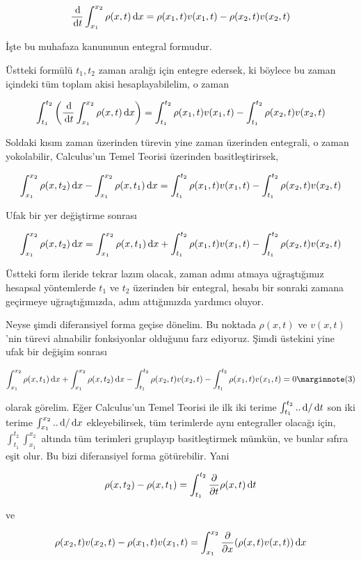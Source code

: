 \documentclass[12pt,fleqn]{article}\usepackage{../../common}
\begin{document}
$$
\frac{\,\mathrm{d}}{\,\mathrm{d} t} \int _{x_1}^{x_2} \rho(x,t) \,\mathrm{d} x =
\rho(x_1,t) v(x_1,t) - \rho(x_2,t) v(x_2,t)
$$

İşte bu muhafaza kanununun entegral formudur. 

Üstteki formülü $t_1,t_2$ zaman aralığı için entegre edersek, ki böylece
bu zaman içindeki tüm toplam akisi hesaplayabilelim, o zaman

$$
\int_{t_1}^{t_2} \left( \frac{\,\mathrm{d}}{\,\mathrm{d} t} \int _{x_1}^{x_2} \rho(x,t) \,\mathrm{d} x  \right)  =
\int_{t_1}^{t_2} \rho(x_1,t) v(x_1,t) - \int_{t_1}^{t_2}  \rho(x_2,t) v(x_2,t) 
$$

Soldaki kısım zaman üzerinden türevin yine zaman üzerinden entegrali, o zaman
yokolabilir, Calculus'un Temel Teorisi üzerinden basitleştirirsek,

$$
\int _{x_1}^{x_2} \rho(x,t_2) \,\mathrm{d} x - \int _{x_1}^{x_2} \rho(x,t_1) \,\mathrm{d} x  = 
\int_{t_1}^{t_2} \rho(x_1,t) v(x_1,t) - \int_{t_1}^{t_2}  \rho(x_2,t) v(x_2,t) 
$$

Ufak bir yer değiştirme sonrası

$$
\int _{x_1}^{x_2} \rho(x,t_2) \,\mathrm{d} x =
\int _{x_1}^{x_2} \rho(x,t_1) \,\mathrm{d} x  +
\int_{t_1}^{t_2} \rho(x_1,t) v(x_1,t) -
\int_{t_1}^{t_2}  \rho(x_2,t) v(x_2,t) 
$$

Üstteki form ileride tekrar lazım olacak, zaman adımı atmaya uğraştığımız
hesapsal yöntemlerde $t_1$ ve $t_2$ üzerinden bir entegral, hesabı bir sonraki
zamana geçirmeye uğraştığımızda, adım attığımızda yardımcı oluyor.

Neyse şimdi diferansiyel forma geçise dönelim. Bu noktada $\rho(x,t)$ ve
$v(x,t)$'nin türevi alınabilir fonksiyonlar olduğunu farz ediyoruz. Şimdi
üstekini yine ufak bir değişim sonrası

$$
\int _{x_1}^{x_2} \rho(x,t_1) \ud x  +
\int _{x_1}^{x_2} \rho(x,t_2) \ud x -
\int_{t_1}^{t_2}  \rho(x_2,t) v(x_2,t) -
\int_{t_1}^{t_2} \rho(x_1,t) v(x_1,t) = 0
\mlabel{3}
$$

olarak görelim. Eğer Calculus'un Temel Teorisi ile ilk iki terime
$\int_{t_1}^{t_2} .. \,\mathrm{d} / \,\mathrm{d} t$ son iki terime $\int_{x_1}^{x_2} .. \,\mathrm{d} / \,\mathrm{d} x$
ekleyebilirsek, tüm terimlerde aynı entegraller olacağı için, 
$\int_{t_1}^{t_2} \int_{x_1}^{x_2} $ altında tüm terimleri gruplayıp
basitleştirmek mümkün, ve bunlar sıfıra eşit olur. Bu bizi diferansiyel
forma götürebilir. Yani

$$
\rho(x,t_2) - \rho(x,t_1) = \int_{t_1}^{t_2}
\frac{\partial }{\partial t} \rho(x,t) \,\mathrm{d} t
$$

ve

$$
\rho(x_2,t)v(x_2,t) - \rho(x_1,t)v(x_1,t) =
\int _{x_1}^{x_2} \frac{\partial }{\partial x} (\rho(x,t)v(x,t)) \,\mathrm{d} x
$$
\end{document}
